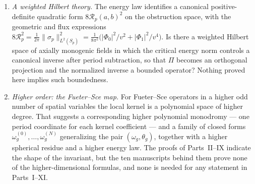 \documentclass[11pt,a4paper]{article}
\numberwithin{equation}{section}
\theoremstyle{definition}
\theoremstyle{remark}
\theoremstyle{plain}
\newcommand{\om}{\omega}
\newcommand{\thet}{\theta}
\newcommand{\Sp}{S_{p}}
\newcommand{\Rp}{\mathcal R_{p}}      %
\newcommand{\abs}[1]{\lvert #1\rvert}
\newcommand{\norm}[1]{\lVert #1\rVert}
\begin{document}
\begin{enumerate}[label=\textup{(O\arabic*)}]
\emph{Partly answered 2026-09-30 by Part~XIV (source~12), for every $h$.}
Every period assignment on an arbitrary connected base is realized
(Theorem~\ref{h:thm:surjectivity}). In the compact-open Fr\'echet topology
there is \emph{no} continuous linear, or even continuous positively
homogeneous, kernel splitting on the full space of period data once the
admissible period rank is infinite (Theorem~\ref{h:thm:split}), but there is a
continuous nonlinear one (Theorem~\ref{h:thm:nonlinear}) and a continuous
linear one on every prescribed magnitude envelope
(Theorem~\ref{h:thm:weighted}). Still open: sharp norm control, growth near
accumulating boundary components, and period images in fixed analytic norm
spaces ((R1) and (R2) of \S\ref{h:sec:future}).
\item \emph{A weighted Hilbert theory.} The energy law identifies a
canonical positive-definite quadratic form $8\Rp(a,b)^2$ on the obstruction
space, with the geometric and flux expressions
$8\Rp^2=\frac1{2\pi}\norm{\sigma_p}^2_{L^2(\Sp)}
=\frac1{8\pi^2}\bigl(\abs{\Phi_0}^2/v^2+\abs{\Phi_1}^2/v^4\bigr)$.
Is there a weighted Hilbert space of axially monogenic fields in which the
critical energy norm controls a canonical inverse after period subtraction,
so that $\Pi$ becomes an orthogonal projection and the normalized inverse a
bounded operator? Nothing proved here implies such boundedness.
\item \emph{Higher order: the Fueter--Sce map.} For Fueter--Sce operators
in a higher odd number of spatial variables the local kernel is a
polynomial space of higher degree. That suggests a corresponding higher
polynomial monodromy --- one period coordinate for each kernel coefficient
--- and a family of closed forms $\om^{(0)}_g,\dots,\om^{(N)}_g$
generalizing the pair $(\om_g,\thet_g)$, together with a higher spherical
residue and a higher energy law. The proofs of Parts~II--IX indicate the
shape of the invariant, but the ten manuscripts behind them prove none of the
higher-dimensional formulas, and none is needed for any statement in
Parts~I--XI.


\end{enumerate}
\end{document}
